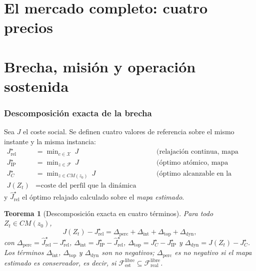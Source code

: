 \documentclass[11pt,a4paper]{article}
\theoremstyle{plain}
\newtheorem{teorema}{Teorema}[section]
\theoremstyle{definition}
\theoremstyle{remark}
\newcommand{\Xcal}{\mathcal{X}}
\newcommand{\Fcal}{\mathcal{F}}
\begin{document}














\part{El mercado completo: cuatro precios}







\part{Brecha, misión y operación sostenida}

\section{Descomposición exacta de la brecha}
\label{sec:descomposicion}

Sea $J$ el coste social. Se definen cuatro valores de referencia sobre el mismo
instante y la misma instancia:
\begin{align*}
  J^{\star}_{\mathrm{rel}} &= \min\nolimits_{c\in\Xcal}\ J
    &&\text{(relajación continua, mapa verdadero)}\\
  J^{\star}_{\mathrm{IP}}  &= \min\nolimits_{z\in\Fcal}\ J
    &&\text{(óptimo atómico, mapa verdadero)}\\
  J^{\star}_{C}            &= \min\nolimits_{z\in CM(z_0)}\ J
    &&\text{(óptimo alcanzable en la componente)}\\
  J(Z_t)                   &= \text{coste del perfil que la dinámica alcanza,}
\end{align*}
y $\hat J^{\star}_{\mathrm{rel}}$ el óptimo relajado calculado sobre el
\emph{mapa estimado}.

\begin{teorema}[Descomposición exacta en cuatro términos]
\label{th:descomposicion}
Para todo $Z_t\in CM(z_0)$,
\[
  J(Z_t)-J^{\star}_{\mathrm{rel}}
  =\Delta_{\mathrm{perc}}+\Delta_{\mathrm{int}}
   +\Delta_{\mathrm{top}}+\Delta_{\mathrm{dyn}},
\]
con
$\Delta_{\mathrm{perc}}=\hat J^{\star}_{\mathrm{rel}}-J^{\star}_{\mathrm{rel}}$,
$\Delta_{\mathrm{int}}=J^{\star}_{\mathrm{IP}}-\hat J^{\star}_{\mathrm{rel}}$,
$\Delta_{\mathrm{top}}=J^{\star}_{C}-J^{\star}_{\mathrm{IP}}$ y
$\Delta_{\mathrm{dyn}}=J(Z_t)-J^{\star}_{C}$. Los términos
$\Delta_{\mathrm{int}}$, $\Delta_{\mathrm{top}}$ y $\Delta_{\mathrm{dyn}}$ son
no negativos; $\Delta_{\mathrm{perc}}$ es no negativo si el mapa estimado es
conservador, es decir, si $\Fcal^{\mathrm{libre}}_{\text{est}}\subseteq
\Fcal^{\mathrm{libre}}_{\text{real}}$.
\end{teorema}
\end{document}
